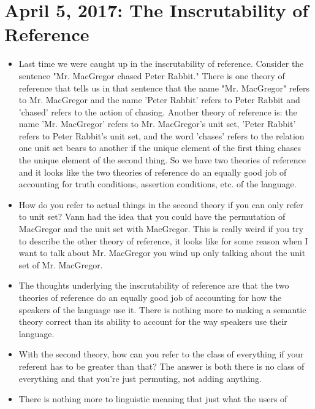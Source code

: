 \documentclass[12pt]{article}
\theoremstyle{definition}
\begin{document}
\section{April 5, 2017: The Inscrutability of Reference}

\begin{itemize}
    \itemsep0em 
    \item
        Last time we were caught up in the inscrutability of reference.
        Consider the sentence "Mr. MacGregor chased Peter Rabbit." There is one
        theory of reference that tells us in that sentence that the name "Mr.
        MacGregor" refers to Mr. MacGregor and the name 'Peter Rabbit' refers
        to Peter Rabbit and 'chased' refers to the action of chasing. Another
        theory of reference is: the name 'Mr. MacGregor' refers to Mr.
        MacGregor's unit set, 'Peter Rabbit' refers to Peter Rabbit's unit set,
        and the word 'chases' refers to the relation one unit set bears to
        another if the unique element of the first thing chases the unique
        element of the second thing. So we have two theories of reference and
        it looks like the two theories of reference do an equally good job of
        accounting for truth conditions, assertion conditions, etc. of the
        language.
    \item
        How do you refer to actual things in the second theory if you can only
        refer to unit set? Vann had the idea that you could have the
        permutation of MacGregor and the unit set with MacGregor. This is
        really weird if you try to describe the other theory of reference, it
        looks like for some reason when I want to talk about Mr. MacGregor you
        wind up only talking about the unit set of Mr. MacGregor.
    \item
        The thoughts underlying the inscrutability of reference are that the
        two theories of reference do an equally good job of accounting for how
        the speakers of the language use it. There is nothing more to making a
        semantic theory correct than its ability to account for the way
        speakers use their language.
    \item
        With the second theory, how can you refer to the class of everything if
        your referent has to be greater than that? The answer is both there is
        no class of everything and that you're just permuting, not adding
        anything.
    \item
        There is nothing more to linguistic meaning that just what the users of

\end{itemize}
\end{document}

